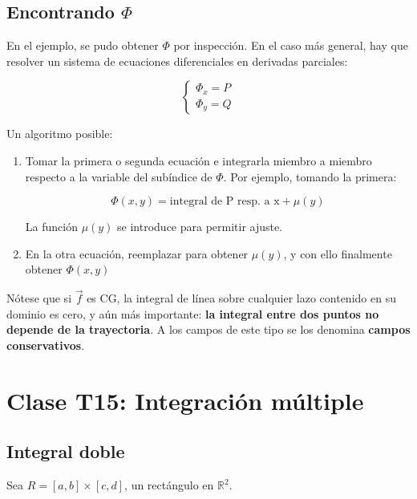 \documentclass{article}
\renewcommand{\Bbb}{\mathbb}
\begin{document}
\subsection{Encontrando \texorpdfstring{$\Phi$}{phi}}

En el ejemplo, se pudo obtener $\Phi$ por inspección. En el caso más general, hay que resolver un sistema de ecuaciones diferenciales en derivadas parciales:

\begin{equation}
\left\{
\begin{array}{ll}
\Phi_x = P \\
\Phi_y = Q
\end{array}
\right.
\end{equation}

Un algoritmo posible:

\begin{enumerate}
\item Tomar la primera o segunda ecuación e integrarla miembro a miembro respecto a la variable del subíndice de $\Phi$. Por ejemplo, tomando la primera:

\begin{equation}
\Phi(x,y) = \text{integral de P resp. a x} + \mu(y)
\end{equation}

La función $\mu(y)$ se introduce para permitir ajuste.

\item En la otra ecuación, reemplazar para obtener $\mu(y)$, y con ello finalmente obtener $\Phi(x,y)$

\end{enumerate}

Nótese que si $\overrightarrow{f}$ es CG, la integral de línea sobre cualquier lazo contenido en su dominio es cero, y aún más importante: \textbf{la integral entre dos puntos no depende de la trayectoria}. A los campos de este tipo se los denomina \textbf{campos conservativos}.

\section{Clase T15: Integración múltiple}

\subsection{Integral doble}

Sea $R = [a, b] \times [c, d]$, un rectángulo en $\Bbb R^2$.
\end{document}
